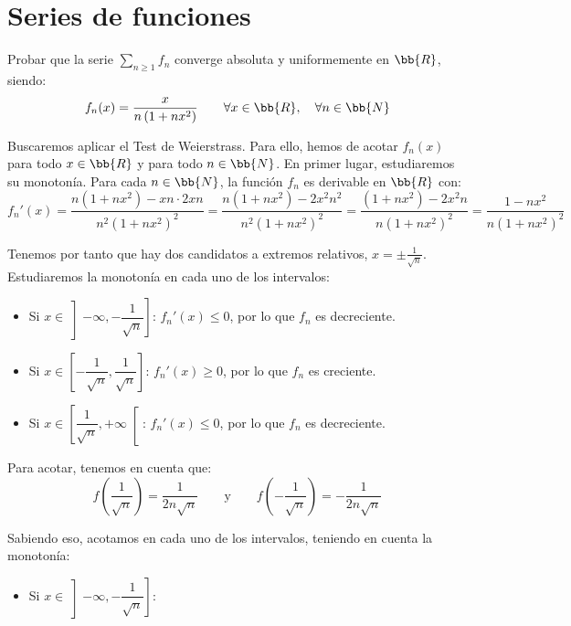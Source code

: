 \section{Series de funciones}

\begin{ejercicio}
    Probar que la serie $\sum\limits_{n\geq 1}f_n$ converge absoluta y uniformemente en $\bb{R}$, siendo:
    \begin{equation*}
        f_n(x) = \frac{x}{n\left(1+nx^2\right)} \qquad \forall x\in\bb{R},\quad \forall n\in\bb{N}
    \end{equation*}

    Buscaremos aplicar el Test de Weierstrass. Para ello, hemos de acotar $f_n(x)$ para todo $x\in\bb{R}$ y para todo $n\in\bb{N}$.
    En primer lugar, estudiaremos su monotonía. Para cada $n\in\bb{N}$, la función $f_n$ es derivable en $\bb{R}$ con:
    \begin{equation*}
        f_n'(x) = \frac{n\left(1+nx^2\right) -xn\cdot 2xn }{n^2\left(1+nx^2\right)^2}
        = \frac{n\left(1+nx^2\right)-2x^2n^2}{n^2\left(1+nx^2\right)^2}
        = \frac{\left(1+nx^2\right)-2x^2n}{n\left(1+nx^2\right)^2}
        = \frac{1-nx^2}{n\left(1+nx^2\right)^2}
    \end{equation*}

    Tenemos por tanto que hay dos candidatos a extremos relativos, $x=\pm \frac{1}{\sqrt{n}}$. Estudiaremos la monotonía en cada uno de los intervalos:
    \begin{itemize}
        \item {Si $x\in \left]-\infty,-\dfrac{1}{\sqrt{n}}\right]$:} $f_n'(x) \leq 0$, por lo que $f_n$ es decreciente.
        \item {Si $x\in \left[-\dfrac{1}{\sqrt{n}},\dfrac{1}{\sqrt{n}}\right]$:} $f_n'(x) \geq 0$, por lo que $f_n$ es creciente.
        \item {Si $x\in \left[\dfrac{1}{\sqrt{n}},+\infty\right[$:} $f_n'(x) \leq 0$, por lo que $f_n$ es decreciente.
    \end{itemize}
    
    Para acotar, tenemos en cuenta que:
    \begin{equation*}
        f\left(\frac{1}{\sqrt{n}}\right) = \frac{1}{2n\sqrt{n}} \qquad \text{y} \qquad f\left(-\frac{1}{\sqrt{n}}\right) = -\frac{1}{2n\sqrt{n}}
    \end{equation*}

    Sabiendo eso, acotamos en cada uno de los intervalos, teniendo en cuenta la monotonía:
    \begin{itemize}
        \item {Si $x\in \left]-\infty,-\dfrac{1}{\sqrt{n}}\right]$}:
        

\end{itemize}
\end{ejercicio}
